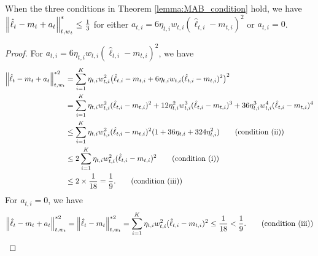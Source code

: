 \begin{lemma}
\label{lemma:condition_automatic_hold}
When the three conditions in Theorem \ref{lemma:MAB_condition} hold, we have $\left\lVert\hat{\ell}_t-m_t+a_t\right\rVert^{*}_{t,w_t}\leq \frac{1}{3}$ for either $a_{t,i}=6\eta_{t,i}w_{t,i}(\hat{\ell}_{t,i}-m_{t,i})^2$ or $a_{t,i}=0$.  
\end{lemma}
\begin{proof}
For $a_{t,i}=6\eta_{t,i}w_{t,i}(\hat{\ell}_{t,i}-m_{t,i})^2$, we have
\begin{align*}
\left\lVert\hat{\ell}_t-m_t+a_t\right\rVert^{*2}_{t,w_t}
&= \sum_{i=1}^K\eta_{t,i}w_{t,i}^2\big(\hat{\ell}_{t,i}-m_{t,i} + 6\eta_{t,i}w_{t,i}(\hat{\ell}_{t,i}-m_{t,i})^2\big)^2 \\
&=\sum_{i=1}^K\eta_{t,i}w_{t,i}^2(\hat{\ell}_{t,i}-m_{t,i})^2+12\eta_{t,i}^2w_{t,i}^3(\hat{\ell}_{t,i}-m_{t,i})^3 +36\eta_{t,i}^3w_{t,i}^4(\hat{\ell}_{t,i}-m_{t,i})^4\\
&\leq \sum_{i=1}^K \eta_{t,i}w_{t,i}^2(\hat{\ell}_{t,i}-m_{t,i})^2(1+36\eta_{t,i}+324\eta_{t,i}^2) \tag{condition (ii)}\\
&\leq 2\sum_{i=1}^K \eta_{t,i}w_{t,i}^2(\hat{\ell}_{t,i}-m_{t,i})^2 \tag{condition (i)}\\
&\leq 2\times \frac{1}{18}=\frac{1}{9}.\tag{condition (iii)}
\end{align*}
For $a_{t,i}=0$, we have
\begin{align*}
\left\lVert\hat{\ell}_t-m_t+a_t\right\rVert^{*2}_{t,w_t}=\left\lVert\hat{\ell}_t-m_t\right\rVert^{*2}_{t,w_t}=\sum_{i=1}^K \eta_{t,i}w_{t,i}^2(\hat{\ell}_{t,i}-m_{t,i})^2\leq \frac{1}{18} < \frac{1}{9}. \tag{condition (iii)}
\end{align*}
\end{proof}

